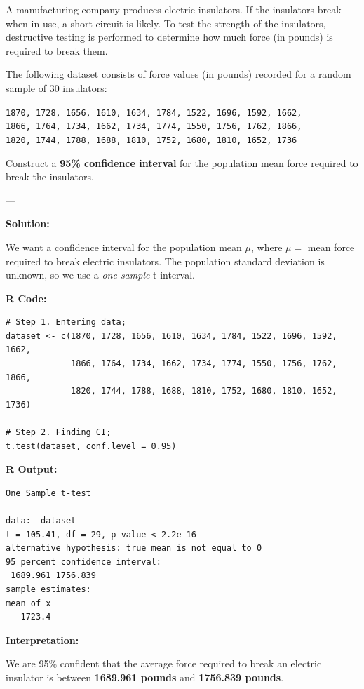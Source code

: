 \begin{example}

A manufacturing company produces electric insulators. If the insulators break when in use, a short circuit is likely. To test the strength of the insulators, destructive testing is performed to determine how much force (in pounds) is required to break them.

The following dataset consists of force values (in pounds) recorded for a random sample of 30 insulators:

\begin{center}
\small
\texttt{1870, 1728, 1656, 1610, 1634, 1784, 1522, 1696, 1592, 1662,}\\
\texttt{1866, 1764, 1734, 1662, 1734, 1774, 1550, 1756, 1762, 1866,}\\
\texttt{1820, 1744, 1788, 1688, 1810, 1752, 1680, 1810, 1652, 1736}
\end{center}

Construct a \textbf{95\% confidence interval} for the population mean force required to break the insulators.


---

 \textbf{Solution:}

We want a confidence interval for the population mean \(\mu\), where \(\mu =\) mean force required to break electric insulators. The population standard deviation is unknown, so we use a \textit{one-sample} t-interval.

\vspace{1em}
\textbf{R Code:}

\begin{verbatim}
# Step 1. Entering data;
dataset <- c(1870, 1728, 1656, 1610, 1634, 1784, 1522, 1696, 1592, 1662,
             1866, 1764, 1734, 1662, 1734, 1774, 1550, 1756, 1762, 1866,
             1820, 1744, 1788, 1688, 1810, 1752, 1680, 1810, 1652, 1736)

# Step 2. Finding CI;
t.test(dataset, conf.level = 0.95)
\end{verbatim}

\vspace{1em}
\textbf{R Output:}

\begin{verbatim}
One Sample t-test

data:  dataset
t = 105.41, df = 29, p-value < 2.2e-16
alternative hypothesis: true mean is not equal to 0
95 percent confidence interval:
 1689.961 1756.839
sample estimates:
mean of x 
   1723.4 
\end{verbatim}

\vspace{1em}
\textbf{Interpretation:}

We are 95\% confident that the average force required to break an electric insulator is between \textbf{1689.961 pounds} and \textbf{1756.839 pounds}.
\end{example}

